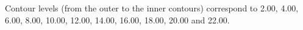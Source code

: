 Contour levels (from the outer to the inner contours) correspond to 2.00, 4.00, 6.00, 8.00, 10.00, 12.00, 14.00, 16.00, 18.00, 20.00 and 22.00.
